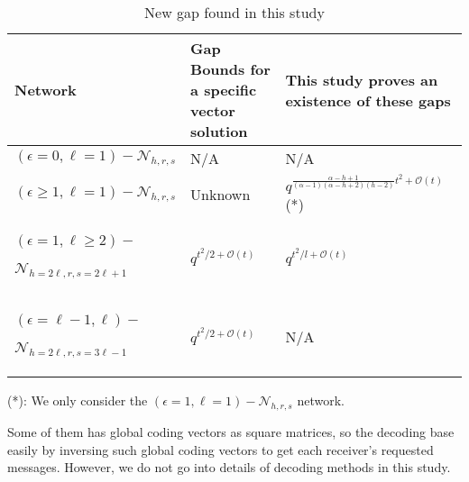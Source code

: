 \begin{table}

\caption{New gap found in this study}

\begin{centering}
\begin{tabular}{|>{\centering}p{0.15\paperwidth}|>{\centering}p{0.1\paperwidth}|>{\centering}p{0.2\paperwidth}|}
\hline 
\centering{}Network & \centering{}Gap Bounds for a specific vector solution \cite{Wachter-Zeh:2018} & \centering{}This study proves an existence of these gaps\tabularnewline
\hline 
\hline 
\centering{}$\left(\epsilon=0,\ell=1\right)-\mathcal{N}_{h,r,s}$ & \centering{}N/A & \centering{}N/A\tabularnewline
\hline 
\centering{}$\left(\epsilon\geq1,\ell=1\right)-\mathcal{N}_{h,r,s}$ & \centering{}Unknown & \centering{}$q^{\frac{\alpha-h+1}{\left(\alpha-1\right)\left(\alpha-h+2\right)\left(h-2\right)}t^{2}+\mathcal{O}(t)}$
({*})\tabularnewline
\hline 
\begin{centering}
$(\epsilon=1,\ell\geq2)-$
\par\end{centering}
$\mathcal{N}_{h=2\ell,r,s=2\ell+1}$ & \centering{}$q^{t^{2}/2+\mathcal{O}\left(t\right)}$ & \centering{}$q^{t^{2}/l+\mathcal{O}\left(t\right)}$\tabularnewline
\hline 
\begin{centering}
$\left(\epsilon=\ell-1,\ell\right)-$
\par\end{centering}
$\mathcal{N}_{h=2\ell,r,s=3\ell-1}$ & \centering{}$q^{t^{2}/2+\mathcal{O}\left(t\right)}$ & \centering{}N/A\tabularnewline
\hline 
\end{tabular}
\par\end{centering}
\begin{centering}
({*}): We only consider the $\left(\epsilon=1,\ell=1\right)-\mathcal{N}_{h,r,s}$
network.
\par\end{centering}
\end{table}

Some of them has global coding vectors as square matrices, so the
decoding base easily by inversing such global coding vectors to get
each receiver's requested messages. However, we do not go into details
of decoding methods in this study.

\clearpage